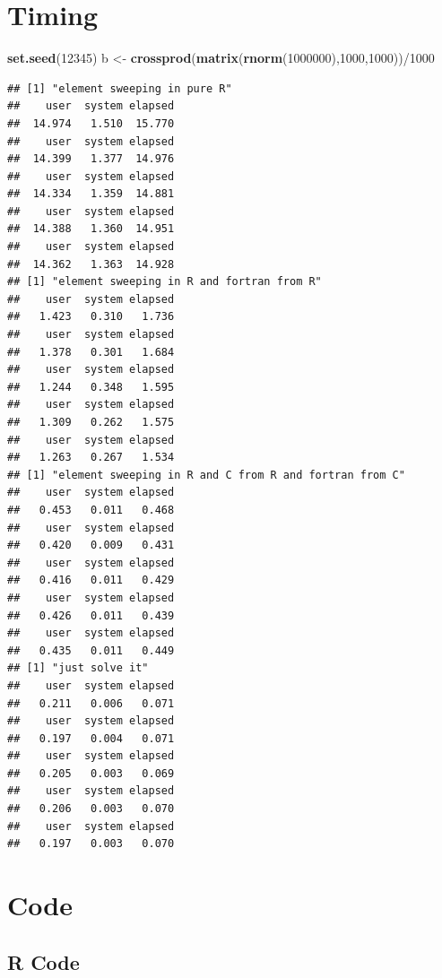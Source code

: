 \documentclass[]{article}
\newenvironment{Shaded}{\begin{snugshade}}{\end{snugshade}}
\newcommand{\KeywordTok}[1]{\textcolor[rgb]{0.13,0.29,0.53}{\textbf{{#1}}}}
\newcommand{\DecValTok}[1]{\textcolor[rgb]{0.00,0.00,0.81}{{#1}}}
\newcommand{\StringTok}[1]{\textcolor[rgb]{0.31,0.60,0.02}{{#1}}}
\newcommand{\NormalTok}[1]{{#1}}
\begin{document}
\section{Timing}\label{timing}

\begin{Shaded}
\begin{Highlighting}[]
\KeywordTok{set.seed}\NormalTok{(}\DecValTok{12345}\NormalTok{)}
\NormalTok{b <-}\StringTok{ }\KeywordTok{crossprod}\NormalTok{(}\KeywordTok{matrix}\NormalTok{(}\KeywordTok{rnorm}\NormalTok{(}\DecValTok{1000000}\NormalTok{),}\DecValTok{1000}\NormalTok{,}\DecValTok{1000}\NormalTok{))/}\DecValTok{1000}
\end{Highlighting}
\end{Shaded}

\begin{verbatim}
## [1] "element sweeping in pure R"
##    user  system elapsed 
##  14.974   1.510  15.770 
##    user  system elapsed 
##  14.399   1.377  14.976 
##    user  system elapsed 
##  14.334   1.359  14.881 
##    user  system elapsed 
##  14.388   1.360  14.951 
##    user  system elapsed 
##  14.362   1.363  14.928 
## [1] "element sweeping in R and fortran from R"
##    user  system elapsed 
##   1.423   0.310   1.736 
##    user  system elapsed 
##   1.378   0.301   1.684 
##    user  system elapsed 
##   1.244   0.348   1.595 
##    user  system elapsed 
##   1.309   0.262   1.575 
##    user  system elapsed 
##   1.263   0.267   1.534 
## [1] "element sweeping in R and C from R and fortran from C"
##    user  system elapsed 
##   0.453   0.011   0.468 
##    user  system elapsed 
##   0.420   0.009   0.431 
##    user  system elapsed 
##   0.416   0.011   0.429 
##    user  system elapsed 
##   0.426   0.011   0.439 
##    user  system elapsed 
##   0.435   0.011   0.449 
## [1] "just solve it"
##    user  system elapsed 
##   0.211   0.006   0.071 
##    user  system elapsed 
##   0.197   0.004   0.071 
##    user  system elapsed 
##   0.205   0.003   0.069 
##    user  system elapsed 
##   0.206   0.003   0.070 
##    user  system elapsed 
##   0.197   0.003   0.070
\end{verbatim}

\section{Code}\label{code}

\subsection{R Code}\label{r-code}
\end{document}
